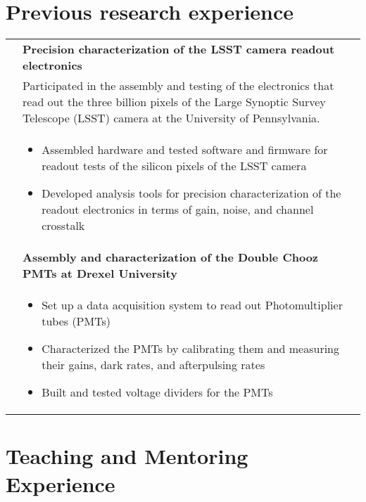 \documentclass[a4paper,10pt]{article}
\begin{document}
\section{Previous research experience}
\begin{tabularx}{\textwidth}{>{\centering\arraybackslash}X p{} }

{\sl 2011--2012} & {\bf Precision characterization of the LSST camera readout electronics}  \\

  & Participated in the assembly and testing of the electronics that read out the three billion pixels of the Large Synoptic
  Survey Telescope (LSST) camera at the University of Pennsylvania. \\

  & \begin{itemize}
  \item Assembled hardware and tested software and firmware for readout tests of the silicon pixels of the LSST camera
  \item Developed analysis tools for precision characterization of the readout electronics in terms of gain, noise, and channel crosstalk
  \end{itemize} \\

  {\sl 2010--2011} &{\bf Assembly and characterization of the Double Chooz PMTs at Drexel University} \\
  & \begin{itemize}
  \item Set up a data acquisition system to read out Photomultiplier tubes (PMTs)
  \item Characterized the PMTs by calibrating them and measuring their gains, dark rates, and afterpulsing rates
  \item Built and tested voltage dividers for the PMTs
  \end{itemize}\\

\end{tabularx}

\vspace{3mm}
\section{Teaching and Mentoring Experience}
\end{document}
